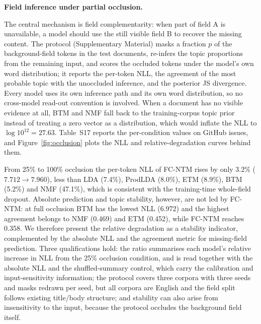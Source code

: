 \documentclass[Journal,letterpaper,NoLists]{ascelike-new}
\newcommand{\fcntm}{FC-NTM}
\begin{document}
\noindent\textbf{Field inference under partial occlusion.} \label{sec:occl}

The central mechanism is field complementarity: when part of field A is unavailable, a model should
use the still visible field B to recover the missing content. The protocol (Supplementary Material)
masks a fraction $p$ of the background-field tokens in the test documents, re-infers the topic
proportions from the remaining input, and scores the occluded tokens under the model's own word
distribution; it reports the per-token NLL, the agreement of the most probable topic with the
unoccluded inference, and the posterior JS divergence. Every model uses its own inference path and
its own word distribution, so no cross-model read-out convention is involved. When a document has
no visible evidence at all, BTM and NMF fall back to the training-corpus topic prior instead of
treating a zero vector as a distribution, which would inflate the NLL to $\log 10^{12}=27.63$.
Table~S17 reports the per-condition values on GitHub issues, and
Figure~\ref{fig:occlusion} plots the NLL and relative-degradation curves behind them.

From 25\% to 100\% occlusion the per-token NLL of \fcntm{} rises by only 3.2\% ($7.712\to7.960$),
less than LDA (7.4\%), ProdLDA (8.0\%), ETM (8.9\%), BTM (5.2\%) and NMF (47.1\%), which is
consistent with the training-time whole-field dropout. Absolute prediction and topic stability,
however, are not led by \fcntm{}: at full occlusion BTM has the lowest NLL (6.972) and the highest
agreement belongs to NMF (0.469) and ETM (0.452), while \fcntm{} reaches 0.358. We therefore present the relative degradation as a stability indicator, complemented by the absolute NLL and the agreement metric for missing-field prediction. Three qualifications
hold: the ratio summarises each model's relative increase in NLL from the 25\% occlusion condition, and is read together with the absolute NLL and the shuffled-summary control, which carry the calibration and input-sensitivity information; the protocol covers three corpora with three seeds and masks redrawn
per seed, but all corpora are English and the field split follows existing title/body structure; and
stability can also arise from insensitivity to the input, because the protocol occludes the
background field itself.
\end{document}
